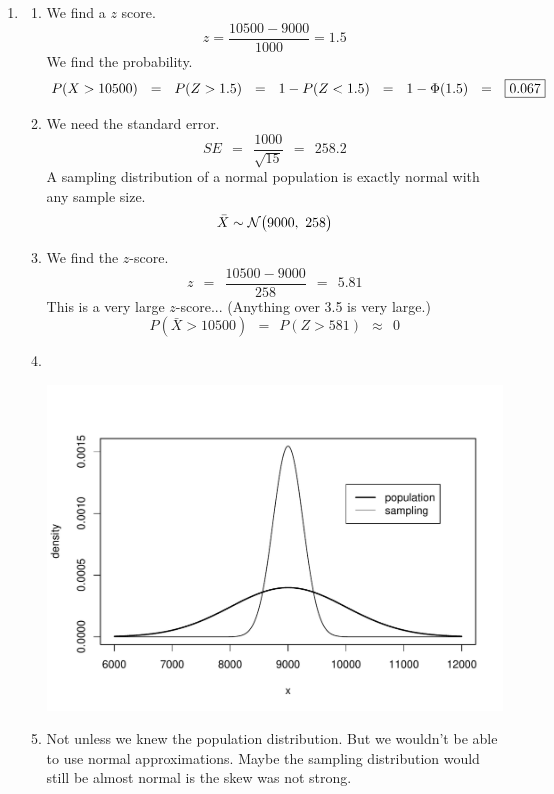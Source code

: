 \documentclass[12pt,letterpaper]{article}
\begin{document}
\begin{enumerate}
\item \begin{enumerate}
\item We find a $z$ score.
$$z = \frac{10500-9000}{1000} = 1.5 $$
We find the probability.
$$P(X>10500) ~~=~~ P(Z>1.5) ~~=~~ 1-P(Z<1.5)~~=~~ 1-\Phi(1.5) ~~=~~ \fbox{0.067} $$
\item We need the standard error.
$$SE ~~=~~ \frac{1000}{\sqrt{15}} ~~=~~ 258.2 $$
A sampling distribution of a normal population is exactly normal with any sample size.
$$\bar{X} \sim \mathcal{N}\big(9000,~258\big) $$
\item We find the $z$-score.
$$z ~~=~~ \frac{10500-9000}{258} ~~=~~ 5.81 $$
This is a very large $z$-score... (Anything over 3.5 is very large.) 
$$P(\bar{X} > 10500) ~~=~~ P(Z>581) ~~\approx~~ 0  $$
\item {~}\\\vspace{-100pt}
\begin{center}
\includegraphics[scale=0.9]{code/Ex4p40_overlay.pdf}
\end{center}
\item Not unless we knew the population distribution. But we wouldn't be able to use normal approximations. Maybe the sampling distribution would still be almost normal is the skew was not strong.
\end{enumerate}


\newpage


\end{enumerate}
\end{document}
